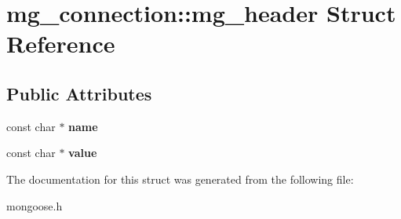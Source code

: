 \hypertarget{structmg__connection_1_1mg__header}{\section{mg\-\_\-connection\-:\-:mg\-\_\-header Struct Reference}
\label{structmg__connection_1_1mg__header}
}
\subsection*{Public Attributes}
\begin{DoxyCompactItemize}
\item 
\hypertarget{structmg__connection_1_1mg__header_aedc58218d3a1364007fb40c85c77ed38}{const char $\ast$ {\bfseries name}}\label{structmg__connection_1_1mg__header_aedc58218d3a1364007fb40c85c77ed38}

\item 
\hypertarget{structmg__connection_1_1mg__header_af2b60bf6efc5265fceed591c6c2e0741}{const char $\ast$ {\bfseries value}}\label{structmg__connection_1_1mg__header_af2b60bf6efc5265fceed591c6c2e0741}

\end{DoxyCompactItemize}


The documentation for this struct was generated from the following file\-:\begin{DoxyCompactItemize}
\item 
mongoose.\-h\end{DoxyCompactItemize}
